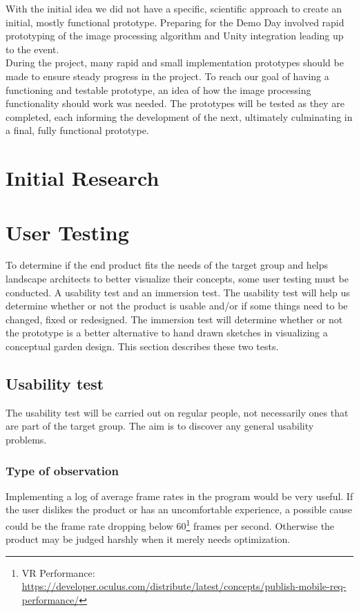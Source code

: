 With the initial idea we did not have a specific, scientific approach to create an initial, mostly functional prototype. Preparing for the Demo Day involved rapid prototyping of the image processing algorithm and Unity integration leading up to the event.\\

During the project, many rapid and small implementation prototypes should be made to ensure steady progress in the project.
To reach our goal of having a functioning and testable prototype, an idea of how the image processing functionality should work was needed. The prototypes will be tested as they are completed, each informing the development of the next, ultimately culminating in a final, fully functional prototype.\\
\section{Initial Research}


\section{User Testing}\label{sec:userTesting}
To determine if the end product fits the needs of the target group and helps landscape architects to better visualize their concepts, some user testing must be conducted. A usability test and an immersion test. The usability test will help us determine whether or not the product is usable and/or if some things need to be changed, fixed or redesigned. The immersion test will determine whether or not the prototype is a better alternative to hand drawn sketches in visualizing a conceptual garden design. This section describes these two tests.

\subsection{Usability test}

The usability test will be carried out on regular people, not necessarily ones that are part of the target group. The aim is to discover any general usability problems. 

\subsubsection{Type of observation}

Implementing a log of average frame rates in the program would be very useful. If the user dislikes the product or has an uncomfortable experience, a possible cause could be the frame rate dropping below 60\footnote{VR Performance: \url{https://developer.oculus.com/distribute/latest/concepts/publish-mobile-req-performance/}} frames per second. Otherwise the product may be judged harshly when it merely needs optimization.\\

